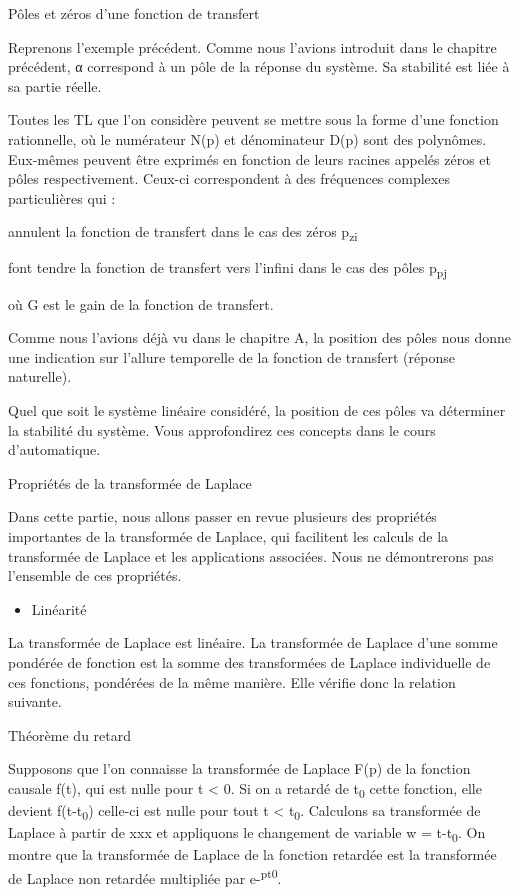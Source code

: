 \documentclass[]{article}
\begin{document}
Pôles et zéros d'une fonction de transfert

Reprenons l'exemple précédent. Comme nous l'avions introduit dans le
chapitre précédent, α correspond à un pôle de la réponse du système. Sa
stabilité est liée à sa partie réelle.~

Toutes les TL que l'on considère peuvent se mettre sous la forme d'une
fonction rationnelle, où le numérateur N(p) et dénominateur D(p) sont
des polynômes. Eux-mêmes peuvent être exprimés en fonction de leurs
racines appelés zéros et pôles respectivement. Ceux-ci correspondent à
des fréquences complexes particulières qui :

annulent la fonction de transfert dans le cas des zéros
p\textsubscript{zi}

font tendre la fonction de transfert vers l'infini dans le cas des pôles
p\textsubscript{pj}

où G est le gain de la fonction de transfert.

Comme nous l'avions déjà vu dans le chapitre A, la position des pôles
nous donne une indication sur l'allure temporelle de la fonction de
transfert (réponse naturelle).

Quel que soit le système linéaire considéré, la position de ces pôles va
déterminer la stabilité du système. Vous approfondirez ces concepts dans
le cours d'automatique.~

Propriétés de la transformée de Laplace

Dans cette partie, nous allons passer en revue plusieurs des propriétés
importantes de la transformée de Laplace, qui facilitent les calculs de
la transformée de Laplace et les applications associées. Nous ne
démontrerons pas l'ensemble de ces propriétés.

\begin{itemize}
\itemsep1pt\parskip0pt
\item
  Linéarité
\end{itemize}

La transformée de Laplace est linéaire. La transformée de Laplace d'une
somme pondérée de fonction est la somme des transformées de Laplace
individuelle de ces fonctions, pondérées de la même manière. Elle
vérifie donc la relation suivante.

Théorème du retard

Supposons que l'on connaisse la transformée de Laplace F(p) de la
fonction causale f(t), qui est nulle pour t \textless{} 0. Si on a
retardé de t\textsubscript{0} cette fonction, elle devient
f(t-t\textsubscript{0}) celle-ci est nulle pour tout t \textless{}
t\textsubscript{0}. Calculons sa transformée de Laplace à partir de xxx
et appliquons le changement de variable w = t-t\textsubscript{0}. On
montre que la transformée de Laplace de la fonction retardée est la
transformée de Laplace non retardée multipliée par
e-\textsuperscript{pt0}.
\end{document}
